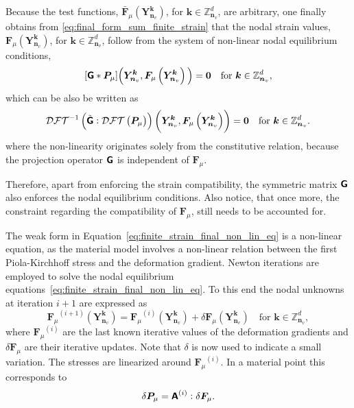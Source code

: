 Because the test functions, \(\bar{\bm F}_\mu(\bm Y_{\bm n_v}^{\bm k})\), for \(\bm k\in \mathbb Z^{d}_{\bm n_v}\), are arbitrary, one finally obtains from \eqref{eq:final_form_sum_finite_strain} that the nodal strain values, \({\bm F}_\mu(\bm Y_{\bm n_v}^{\bm k})\), for \(\bm k\in \mathbb Z^{d}_{\bm n_v}\), follow from the system of non-linear nodal equilibrium conditions,
\begin{equation} \label{eq:final_form_sum}
[\boldsymbol{\mathsf{G}} * \bm P_\mu]\Big(\bm Y_{\bm n_v}^{\bm k}, \bm F_\mu\left(\bm Y_{\bm n_v}^{\bm  k}\right)\Big)=\bm 0\quad \text{for \( \bm k \in \mathbb Z^d_{\bm n_v}\)},
\end{equation}
which can be also be written as
\begin{equation}\label{eq:finite_strain_final_non_lin_eq}
\mathcal{DFT}^{-1}\left(\tilde{\boldsymbol{\mathsf{G}}}:\mathcal{DFT}\left(\bm P_\mu\right)\right)\left(\bm{Y}_{\bm n_v}^{\bm  k}, \bm F_\mu\left(\bm Y_{\bm n_v}^{\bm  k}\right)\right)= \bm 0\quad \text{for \(\bm k \in \mathbb Z^d_{\bm n_v}\)}.
\end{equation}
where the non-linearity originates solely from the constitutive relation, because the projection operator \(\boldsymbol{\mathsf{G}}\) is independent of \(\bm F_\mu\).

Therefore, apart from enforcing the strain compatibility, the symmetric matrix \(\boldsymbol{\mathsf{G}}\) also enforces the nodal equilibrium conditions.
Also notice, that once more, the constraint regarding the compatibility of \(\bm F_\mu\), still needs to be accounted for.

The weak form in Equation~\eqref{eq:finite_strain_final_non_lin_eq} is a non-linear equation, as the material model involves a non-linear relation between the first Piola-Kirchhoff stress and the deformation gradient.
Newton iterations are employed to solve the nodal equilibrium equations~\eqref{eq:finite_strain_final_non_lin_eq}.
To this end the nodal unknowns at iteration \(i+1\) are expressed as
\begin{equation} \label{eq:linearization_finite_strain}
{\bm{F}_\mu}^{(i+1)}\left(\bm Y_{\bm n_v}^{\bm  k}\right)={\bm{F}_\mu}^{(i)}\left(\bm Y_{\bm n_v}^{\bm  k}\right)+\delta {\bm{F}_\mu}\left(\bm Y_{\bm n_v}^{\bm  k}\right)\quad \text{for \(\bm k\in \mathbb Z^d_{\bm n_v}\)},
\end{equation}
where \({\bm{F}_\mu}^{(i)}\) are the last known iterative values of the deformation gradients and \(\delta {\bm{F}_\mu}\) are their iterative updates.
Note that \(\delta\) is now used to indicate a small variation.
The stresses are linearized around \({\bm{F}_\mu}^{(i)}\).
In a material point this corresponds to
\begin{equation} \label{eq:newton_increment}
\delta \bm{P}_\mu=\boldsymbol{\mathsf{A}}^{(i)}: \delta \bm{F}_\mu.
\end{equation}

